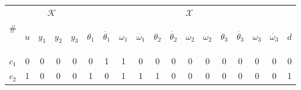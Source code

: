 \documentclass[a4,11pt]{article}
\begin{document}
\begin{table}[!htb]
\centering
\normalsize
\begin{tabular}{|l|cccc|ccccccccccccc|}
\hline
&\multicolumn{4}{c|}{$\mathcal{K}$} & \multicolumn{13}{|c|}{$\mathcal{X}$}\\
\cline{2-18}
\# & \begin{sideways}$u$\end{sideways}& \begin{sideways}$y_1$\end{sideways}& \begin{sideways}$y_2$\end{sideways}& \begin{sideways}$y_3$\end{sideways}& \begin{sideways}$\theta_1$\end{sideways}& \begin{sideways}$\dot{\theta_1}$\end{sideways}& \begin{sideways}$\omega_1$\end{sideways}& \begin{sideways}$\dot{\omega_1}$\end{sideways}& \begin{sideways}$\theta_2$\end{sideways}& \begin{sideways}$\dot{\theta_2}$\end{sideways}& \begin{sideways}$\omega_2$\end{sideways}& \begin{sideways}$\dot{\omega_2}$\end{sideways}& \begin{sideways}$\theta_3$\end{sideways}& \begin{sideways}$\dot{\theta_3}$\end{sideways}& \begin{sideways}$\omega_3$\end{sideways}& \begin{sideways}$\dot{\omega_3}$\end{sideways}& \begin{sideways}$d$\end{sideways} \\ 
\hline
$c_1$  & 0 & 0 & 0 & 0 & 0 & 1 & 1 & 0 & 0 & 0 & 0 & 0 & 0 & 0 & 0 & 0 & 0 \\ 
$c_2$  & 1 & 0 & 0 & 0 & 1 & 0 & 1 & 1 & 1 & 0 & 0 & 0 & 0 & 0 & 0 & 0 & 1 \\ 

\end{tabular}
\end{table}
\end{document}
